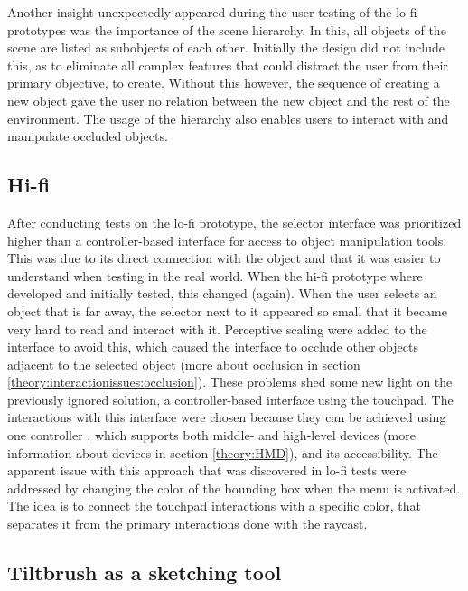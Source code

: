 Another insight unexpectedly appeared during the user testing of the lo-fi prototypes was the importance of the scene hierarchy. In this, all objects of the scene are listed as subobjects of each other. Initially the design did not include this, as to eliminate all complex features that could distract the user from their primary objective, to create. Without this however, the sequence of creating a new object gave the user no relation between the new object and the rest of the environment. The usage of the hierarchy also enables users to interact with and manipulate occluded objects.
\subsection{Hi-fi}
After conducting tests on the lo-fi prototype, the selector interface was prioritized higher than a controller-based interface for access to object manipulation tools. This was due to its direct connection with the object and that it was easier to understand when testing in the real world. When the hi-fi prototype where developed and initially tested, this changed (again). When the user selects an object that is far away, the selector next to it appeared so small that it became very hard to read and interact with it. Perceptive scaling were added to the interface to avoid this, which caused the interface to occlude other objects adjacent to the selected object (more about occlusion in section \ref{theory:interactionissues:occlusion}). These problems shed some new light on the previously ignored solution, a controller-based interface using the touchpad. The interactions with this interface were chosen because they can be achieved using one controller , which supports both middle- and high-level devices (more information about devices in section \ref{theory:HMD}), and its accessibility. The apparent issue with this approach that was discovered in lo-fi tests were addressed by changing the color of the bounding box when the menu is activated. The idea is to connect the touchpad interactions with a specific color, that separates it from the primary interactions done with the raycast.

\subsection{Tiltbrush as a sketching tool}
